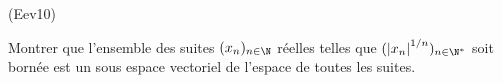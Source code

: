 \begin{tiny}(Eev10)\end{tiny}
Montrer que l'ensemble des suites $(x_{n})_{n\in \N}$ r{\'e}elles telles que $(\left| x_{n}\right| ^{1/n})_{n\in \N^*}$ soit born{\'e}e est un sous espace vectoriel de l'espace de toutes les suites.